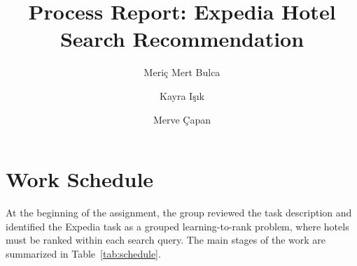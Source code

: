 \documentclass[runningheads]{llncs}
\begin{document}
\title{Process Report: Expedia Hotel Search Recommendation}

\author{Meri\c{c} Mert Bulca \and Kayra I\c{s}\i{}k \and Merve \c{C}apan}


\maketitle

\section{Work Schedule}

At the beginning of the assignment, the group reviewed the task description and identified the Expedia task as a grouped learning-to-rank problem, where hotels must be ranked within each search query. The main stages of the work are summarized in Table~\ref{tab:schedule}.
\end{document}

